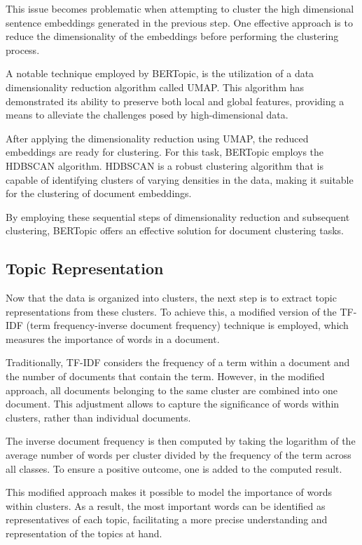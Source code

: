 \documentclass[a4paper,12pt]{report} %
\begin{document}
This issue becomes problematic when attempting to cluster the high dimensional sentence embeddings generated in the previous step. One effective approach is to reduce the dimensionality of the embeddings before performing the clustering process.

A notable technique employed by BERTopic, is the utilization of a data dimensionality reduction algorithm called UMAP. This algorithm has demonstrated its ability to preserve both local and global features, providing a means to alleviate the challenges posed by high-dimensional data.

After applying the dimensionality reduction using UMAP, the reduced embeddings are ready for clustering. For this task, BERTopic employs the HDBSCAN algorithm. HDBSCAN is a robust clustering algorithm that is capable of identifying clusters of varying densities in the data, making it suitable for the clustering of document embeddings.

By employing these sequential steps of dimensionality reduction and subsequent clustering, BERTopic offers an effective solution for document clustering tasks.

\subsection{Topic Representation}
Now that the data is organized into clusters, the next step is to extract topic representations from these clusters. To achieve this, a modified version of the TF-IDF (term frequency-inverse document frequency) technique is employed, which measures the importance of words in a document.

Traditionally, TF-IDF considers the frequency of a term within a document and the number of documents that contain the term. However, in the modified approach, all documents belonging to the same cluster are combined into one document. This adjustment allows to capture the significance of words within clusters, rather than individual documents.

The inverse document frequency is then computed by taking the logarithm of the average number of words per cluster divided by the frequency of the term across all classes. To ensure a positive outcome, one is added to the computed result.

This modified approach makes it possible to model the importance of words within clusters. As a result, the most important words can be identified as representatives of each topic, facilitating a more precise understanding and representation of the topics at hand.
\end{document}
